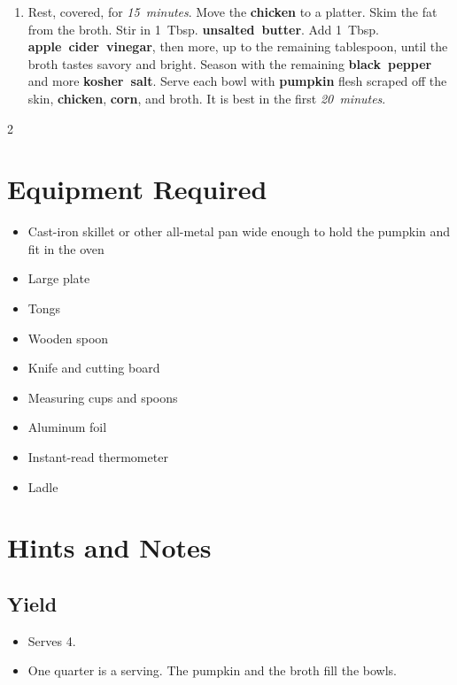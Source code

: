\documentclass[11pt,letterpaper]{article}
\begin{document}
\begin{enumerate}
    \item Rest, covered, for \textit{15~minutes}. Move the \textbf{chicken} to a platter. Skim the fat from the broth. Stir in 1~Tbsp. \textbf{unsalted~butter}. Add 1~Tbsp. \textbf{apple~cider~vinegar}, then more, up to the remaining tablespoon, until the broth tastes savory and bright. Season with the remaining \textbf{black~pepper} and more \textbf{kosher~salt}. Serve each bowl with \textbf{pumpkin} flesh scraped off the skin, \textbf{chicken}, \textbf{corn}, and broth. It is best in the first \textit{20~minutes}.
\end{enumerate}

\newpage

{\small
\setlength{\columnsep}{20pt}
\setlength{\multicolsep}{6pt}
\begin{multicols}{2}
\setlength{\parindent}{0pt}
\setlength{\parskip}{4pt}

\section*{Equipment Required}
\begin{itemize}
    \item Cast-iron skillet or other all-metal pan wide enough to hold the pumpkin and fit in the oven
    \item Large plate
    \item Tongs
    \item Wooden spoon
    \item Knife and cutting board
    \item Measuring cups and spoons
    \item Aluminum foil
    \item Instant-read thermometer
    \item Ladle
\end{itemize}

\section*{Hints and Notes}

\subsection*{Yield}
\begin{itemize}
    \item Serves 4.
    \item One quarter is a serving. The pumpkin and the broth fill the bowls.
\end{itemize}


\end{multicols}}
\end{document}
